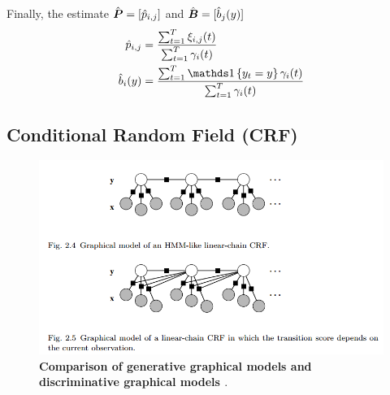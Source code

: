 \documentclass[11pt]{article}
\begin{document}
\begin{itemize}
\begin{itemize}
Finally, the estimate $\hat{\boldsymbol{P}} = [\hat{p}_{i, j}]$ and $\hat{\boldsymbol{B}} = [\hat{b}_{j}(y)]$
\begin{align}
\hat{p}_{i, j} &= \frac{\sum_{t=1}^{T}\xi_{i,j}(t)}{\sum_{t=1}^{T}\gamma_{i}(t) }  \label{eqn: transition_update}\\
\hat{b}_{i}(y) &= \frac{\sum_{t=1}^{T}\ind{y_t = y}\gamma_{i}(t)}{\sum_{t=1}^{T}\gamma_{i}(t)} \label{eqn: emission_update}
\end{align}
\end{itemize}
\end{itemize}




\subsection{Conditional Random Field (CRF)}
\begin{figure}
\begin{minipage}[t]{1\linewidth}
  \centering
  \centerline{\includegraphics[scale = 0.5]{crf.png}}
\end{minipage}
\caption{\footnotesize{\textbf{Comparison of generative graphical models and discriminative graphical models \citep{sutton2012introduction} }.}}
\label{fig: crf}
\end{figure}
\end{document}
